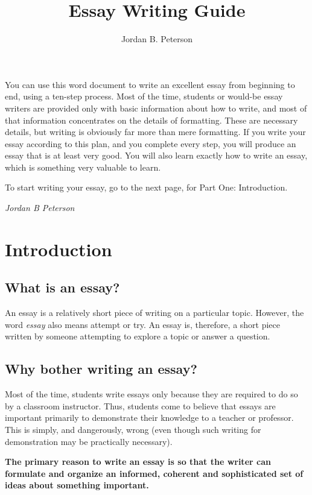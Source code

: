 \documentclass{article}
\author{Jordan B. Peterson}
\title{Essay Writing Guide}
\date{}
\begin{document}
\maketitle

You can use this word document to write an excellent essay from
beginning to end, using a ten-step process. Most of the time, students
or would-be essay writers are provided only with basic information about
how to write, and most of that information concentrates on the details
of formatting. These are necessary details, but writing is obviously far
more than mere formatting. If you write your essay according to this
plan, and you complete every step, you will produce an essay that is at
least very good. You will also learn exactly how to write an essay,
which is something very valuable to learn.

To start writing your essay, go to the next page, for Part One:
Introduction.

\textit{Jordan B Peterson}

\tableofcontents
\clearpage

\section{Introduction}

\subsection{What is an essay?}

An essay is a relatively short piece of writing on a particular topic.
However, the word \emph{essay} also means attempt or try. An essay is,
therefore, a short piece written by someone attempting to explore a
topic or answer a question.

\subsection{Why bother writing an essay?}

Most of the time, students write essays only because they are required
to do so by a classroom instructor. Thus, students come to believe that
essays are important primarily to demonstrate their knowledge to a
teacher or professor. This is simply, and dangerously, wrong (even
though such writing for demonstration may be practically necessary).

\textbf{The primary reason to write an essay is so that the writer can
formulate and organize an informed, coherent and sophisticated set of
ideas about something important.}
\end{document}
